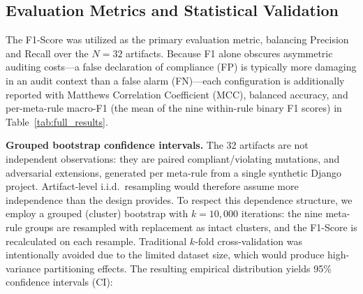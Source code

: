 \documentclass{ieeeaccess}
\begin{document}
\begin{table}[htbp]
\centering
\caption{Experimental hardware and software environment.}
\label{tab:hardware}
\renewcommand{\arraystretch}{1.2}
\end{table}

\subsection{Evaluation Metrics and Statistical Validation}
\label{sec:metrics}

The F1-Score was utilized as the primary evaluation metric, balancing Precision and Recall over the $N=32$ artifacts. Because F1 alone obscures asymmetric auditing costs---a false declaration of compliance (FP) is typically more damaging in an audit context than a false alarm (FN)---each configuration is additionally reported with Matthews Correlation Coefficient (MCC), balanced accuracy, and per-meta-rule macro-F1 (the mean of the nine within-rule binary F1 scores) in Table~\ref{tab:full_results}.

\textbf{Grouped bootstrap confidence intervals.} The 32 artifacts are not independent observations: they are paired compliant/violating mutations, and adversarial extensions, generated per meta-rule from a single synthetic Django project. Artifact-level i.i.d.\ resampling would therefore assume more independence than the design provides. To respect this dependence structure, we employ a grouped (cluster) bootstrap with $k=10{,}000$ iterations: the nine meta-rule groups are resampled with replacement as intact clusters, and the F1-Score is recalculated on each resample. Traditional $k$-fold cross-validation was intentionally avoided due to the limited dataset size, which would produce high-variance partitioning effects. The resulting empirical distribution yields 95\% confidence intervals (CI):
\end{document}
